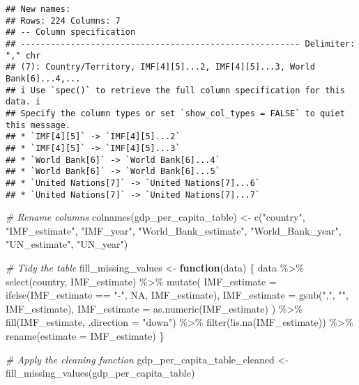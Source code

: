\documentclass[
]{article}
\newenvironment{Shaded}{\begin{snugshade}}{\end{snugshade}}
\newcommand{\AttributeTok}[1]{\textcolor[rgb]{0.77,0.63,0.00}{#1}}
\newcommand{\CommentTok}[1]{\textcolor[rgb]{0.56,0.35,0.01}{\textit{#1}}}
\newcommand{\ConstantTok}[1]{\textcolor[rgb]{0.00,0.00,0.00}{#1}}
\newcommand{\ControlFlowTok}[1]{\textcolor[rgb]{0.13,0.29,0.53}{\textbf{#1}}}
\newcommand{\FunctionTok}[1]{\textcolor[rgb]{0.00,0.00,0.00}{#1}}
\newcommand{\NormalTok}[1]{#1}
\newcommand{\OtherTok}[1]{\textcolor[rgb]{0.56,0.35,0.01}{#1}}
\newcommand{\SpecialCharTok}[1]{\textcolor[rgb]{0.00,0.00,0.00}{#1}}
\newcommand{\StringTok}[1]{\textcolor[rgb]{0.31,0.60,0.02}{#1}}
\begin{document}
\begin{verbatim}
## New names:
## Rows: 224 Columns: 7
## -- Column specification
## -------------------------------------------------------- Delimiter: "," chr
## (7): Country/Territory, IMF[4][5]...2, IMF[4][5]...3, World Bank[6]...4,...
## i Use `spec()` to retrieve the full column specification for this data. i
## Specify the column types or set `show_col_types = FALSE` to quiet this message.
## * `IMF[4][5]` -> `IMF[4][5]...2`
## * `IMF[4][5]` -> `IMF[4][5]...3`
## * `World Bank[6]` -> `World Bank[6]...4`
## * `World Bank[6]` -> `World Bank[6]...5`
## * `United Nations[7]` -> `United Nations[7]...6`
## * `United Nations[7]` -> `United Nations[7]...7`
\end{verbatim}

\begin{Shaded}
\begin{Highlighting}[]
\CommentTok{\# Rename columns}
\FunctionTok{colnames}\NormalTok{(gdp\_per\_capita\_table) }\OtherTok{\textless{}{-}} \FunctionTok{c}\NormalTok{(}\StringTok{"country"}\NormalTok{, }\StringTok{"IMF\_estimate"}\NormalTok{, }\StringTok{"IMF\_year"}\NormalTok{, }
                                    \StringTok{"World\_Bank\_estimate"}\NormalTok{, }\StringTok{"World\_Bank\_year"}\NormalTok{, }
                                    \StringTok{"UN\_estimate"}\NormalTok{, }\StringTok{"UN\_year"}\NormalTok{)}

\CommentTok{\# Tidy the table}
\NormalTok{fill\_missing\_values }\OtherTok{\textless{}{-}} \ControlFlowTok{function}\NormalTok{(data) \{}
\NormalTok{  data }\SpecialCharTok{\%\textgreater{}\%}
    \FunctionTok{select}\NormalTok{(country, IMF\_estimate) }\SpecialCharTok{\%\textgreater{}\%}              
    \FunctionTok{mutate}\NormalTok{(}
      \AttributeTok{IMF\_estimate =} \FunctionTok{ifelse}\NormalTok{(IMF\_estimate }\SpecialCharTok{==} \StringTok{"{-}"}\NormalTok{, }\ConstantTok{NA}\NormalTok{, IMF\_estimate), }
      \AttributeTok{IMF\_estimate =} \FunctionTok{gsub}\NormalTok{(}\StringTok{","}\NormalTok{, }\StringTok{""}\NormalTok{, IMF\_estimate),      }
      \AttributeTok{IMF\_estimate =} \FunctionTok{as.numeric}\NormalTok{(IMF\_estimate)         }
\NormalTok{    ) }\SpecialCharTok{\%\textgreater{}\%}
    \FunctionTok{fill}\NormalTok{(IMF\_estimate, }\AttributeTok{.direction =} \StringTok{"down"}\NormalTok{) }\SpecialCharTok{\%\textgreater{}\%}       
    \FunctionTok{filter}\NormalTok{(}\SpecialCharTok{!}\FunctionTok{is.na}\NormalTok{(IMF\_estimate)) }\SpecialCharTok{\%\textgreater{}\%}                  
    \FunctionTok{rename}\NormalTok{(}\AttributeTok{estimate =}\NormalTok{ IMF\_estimate)                  }
\NormalTok{\}}

\CommentTok{\# Apply the cleaning function}
\NormalTok{gdp\_per\_capita\_table\_cleaned }\OtherTok{\textless{}{-}} \FunctionTok{fill\_missing\_values}\NormalTok{(gdp\_per\_capita\_table)}
\end{Highlighting}
\end{Shaded}
\end{document}
